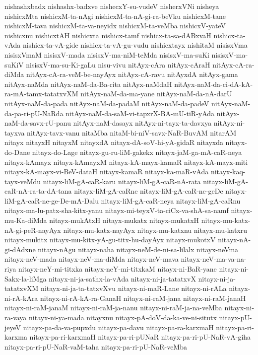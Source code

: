 {nishashxbadx
nishashx-badxve
nishecxY-su-vudeV
nisherxVNi
nisheya
nishicxMta
nishicxM-ta-nAgi
nishicxM-ta-nA-gi-ra-beVku
nishicxM-tane
nishicxM-tava
nishicxM-ta-va-neyidx
nishicxM-ta-veMba
nishicxV-yateV
nishicxnu
nishicxtAH
nishicxta
nishicx-tamf
nishicx-ta-sa-dABxvaH
nishicx-ta-vAda
nishicx-ta-vA-gide
nishicx-ta-vA-gu-vudu
nishicxtayx
nishitaM
nisisxVma
nisisxVmaM
nisisxV-mada
nisisxV-ma-niM-teMda
nisisxV-ma-suKi
nisisxV-ma-suKiV
nisisxV-ma-su-Ki-gaLu
nisu-vivu
nitAyx-cAra
nitAyx-cAraH
nitAyx-cA-ra-diMda
nitAyx-cA-ra-veM-be-nayAyx
nitAyx-cA-ravu
nitAyxdA
nitAyx-gama
nitAyx-naMda
nitAyx-naM-da-Ba-rita
nitAyx-naMdaH
nitAyx-naM-da-ci-dA-kA-ra-mA-tamx-tatatxvXM
nitAyx-naM-da-ma-yane
nitAyx-naM-da-nA-darU
nitAyx-naM-da-pada
nitAyx-naM-da-padaM
nitAyx-naM-da-padeV
nitAyx-naM-da-pa-ri-pU-NaRda
nitAyx-naM-da-saM-vi-tapxrX-BA-mU-tiR-yAda
nitAyx-naM-da-savx-rU-panu
nitAyx-naM-dasayx
nitAyx-ni-tayx-ta-davxya
nitAyx-ni-tayxva
nitAyx-tavx-vanu
nitaMba
nitaM-bi-niV-savx-NaR-BuvAM
nitarAM
nitayx
nitayxH
nitayxM
nitayxdA
nitayx-dA-soV-hi-yA-gidaR
nitayxda
nitayx-do-Dane
nitayx-do-Lage
nitayx-gu-ru-liM-gakekx
nitayx-jaM-ga-mA-caR-neya
nitayx-kAmayx
nitayx-kAmayxM
nitayx-kA-mayx-kamaR
nitayx-kA-mayx-miti
nitayx-kA-mayx-vi-BeV-dataH
nitayx-kamaR
nitayx-ka-maR-vAda
nitayx-kaq-tayx-veMdu
nitayx-liM-gA-caR-karu
nitayx-liM-gA-caR-nA-rata
nitayx-liM-gA-caR-nA-ra-ta-dA-tana
nitayx-liM-gA-caRne
nitayx-liM-gA-caR-ne-geDe
nitayx-liM-gA-caR-ne-ge-De-mA-Dalu
nitayx-liM-gA-caR-neya
nitayx-liM-gA-caRnu
nitayx-ma-lu-patx-sha-kitx-yanu
nitayx-mi-teyxV-ta-ciCx-va-shA-sa-namf
nitayx-mu-Ka-diMda
nitayx-mukAtxH
nitayx-mukatx
nitayx-mukatxH
nitayx-mu-katx-nA-gi-peR-nayAyx
nitayx-mu-katx-nayAyx
nitayx-mu-katxnu
nitayx-mu-katxru
nitayx-mukitx
nitayx-mu-kitx-yA-gu-titx-hu-dayAyx
nitayx-mukotxV
nitayx-nA-gi-dAdxne
nitayx-nAgu
nitayx-naha
nitayx-neM-de-ni-sa-lilalx
nitayx-neVma
nitayx-neV-mada
nitayx-neV-ma-diMda
nitayx-neV-mava
nitayx-neV-ma-va-na-riya
nitayx-neY-mi-titxka
nitayx-neY-mi-titxkaM
nitayx-ni-BaR-yane
nitayx-ni-Sakx-la-liMga
nitayx-ni-ja-sathx-la-vAda
nitayx-ni-ja-tatatxvX
nitayx-ni-ja-tatatxvXM
nitayx-ni-ja-ta-tatxvXvu
nitayx-ni-maR-Lane
nitayx-ni-rALa
nitayx-ni-rA-kAra
nitayx-ni-rA-kA-ra-GanaH
nitayx-ni-raM-jana
nitayx-ni-raM-janaH
nitayx-ni-raM-janaM
nitayx-ni-raM-ja-nanu
nitayx-ni-raM-ja-na-veMba
nitayx-ni-ra-vaya
nitayx-ni-ya-mada
nitayxnu
nitayx-pA-doV-da-ka-ve-ni-situtx
nitayx-pU-jeyeV
nitayx-pa-da-va-pupxdu
nitayx-pa-davu
nitayx-pa-ra-karxmaH
nitayx-pa-ri-karxma
nitayx-pa-ri-karxmaH
nitayx-pa-ri-pUNaR
nitayx-pa-ri-pU-NaR-vA-giha
nitayx-pa-ri-pU-NaR-vaM-taha
nitayx-pa-ri-pU-NaR-veMba
}
